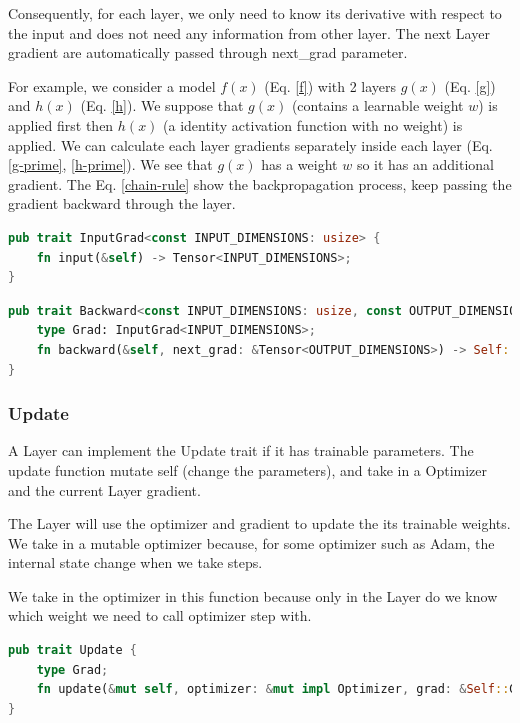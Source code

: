 \documentclass[conference]{IEEEtran}
\begin{document}
Consequently, for each layer, we only need to know its derivative with respect to the input and does not need any information from other layer. The next Layer gradient are automatically passed through next\_grad parameter.

For example, we consider a model \(f(x)\) (Eq. \ref{f}) with 2 layers \(g(x)\) (Eq. \ref{g}) and \(h(x)\) (Eq. \ref{h}). We suppose that \(g(x)\) (contains a learnable weight \(w\)) is applied first then \(h(x)\) (a identity activation function with no weight) is applied. We can calculate each layer gradients separately inside each layer (Eq. \ref{g-prime}, \ref{h-prime}). We see that \(g(x)\) has a weight \(w\) so it has an additional gradient. The Eq. \ref{chain-rule} show the backpropagation process, keep passing the gradient backward through the layer.

\begin{lstlisting}[language=Rust, caption={InputGrad Trait}]
pub trait InputGrad<const INPUT_DIMENSIONS: usize> {
    fn input(&self) -> Tensor<INPUT_DIMENSIONS>;
}
\end{lstlisting}

\begin{lstlisting}[language=Rust, caption={Backward Trait}]
pub trait Backward<const INPUT_DIMENSIONS: usize, const OUTPUT_DIMENSIONS: usize> {
    type Grad: InputGrad<INPUT_DIMENSIONS>;
    fn backward(&self, next_grad: &Tensor<OUTPUT_DIMENSIONS>) -> Self::Grad;
}
\end{lstlisting}


\subsubsection{Update}
A Layer can implement the Update trait if it has trainable parameters. The update function mutate self (change the parameters), and take in a Optimizer and the current Layer gradient.

The Layer will use the optimizer and gradient to update the its trainable weights. We take in a mutable optimizer because, for some optimizer such as Adam, the internal state change when we take steps.

We take in the optimizer in this function because only in the Layer do we know which weight we need to call optimizer step with.

\begin{lstlisting}[language=Rust, caption={Update Trait}]
pub trait Update {
    type Grad;
    fn update(&mut self, optimizer: &mut impl Optimizer, grad: &Self::Grad);
}
\end{lstlisting}
\end{document}
